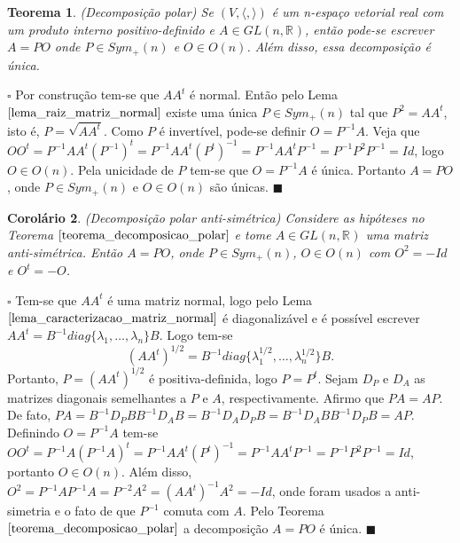 \documentclass[12pt]{book}
\newtheorem{teorema}{Teorema}[section]
\newtheorem{corolario}[teorema]{Corolário}
\newenvironment{prova}[1]{$\square$ #1}{\hfill$\blacksquare$}
\newcommand{\generalgroup}[2]{GL(#1, #2)}
\newcommand{\generalgroupreal}[1]{\generalgroup{#1}{\real{}}}
\newcommand{\matrizortogonal}[1]{O(#1)}
\newcommand{\matrizsimetricapositiva}[1]{Sym_{+}(#1)}
\newcommand{\produtointerno}[2]{\langle #1, #2 \rangle}
\newcommand{\real}[1]{\mathbb{R}^{#1}}
\begin{document}
	\begin{teorema}\label{teorema_decomposicao_polar}
		(Decomposição polar) Se $(V, \produtointerno{}{})$ é um n-espaço vetorial real com um produto interno positivo-definido e $A \in \generalgroupreal{n}$, então pode-se escrever $A=PO$ onde $P \in  \matrizsimetricapositiva{n}$ e $O \in \matrizortogonal{n}$. Além disso, essa decomposição é única.
	\end{teorema}
	\begin{prova}
		Por construção tem-se que $AA^{t}$ é normal. Então pelo Lema $\ref{lema_raiz_matriz_normal}$ existe uma única $P \in \matrizsimetricapositiva{n}$ tal que $P^{2} = AA^{t}$, isto é, $P = \sqrt{AA^{t}}$. Como $P$ é invertível, pode-se definir $O = P^{-1}A$. Veja que $OO^{t} = P^{-1}AA^{t}(P^{-1})^{t} = P^{-1}AA^{t}(P^{t})^{-1} = P^{-1}AA^{t}P^{-1} = P^{-1}P^{2}P^{-1} = Id$, logo $O \in \matrizortogonal{n}$. Pela unicidade de $P$ tem-se que $O=P^{-1}A$ é única. Portanto $A=PO$, onde $P \in \matrizsimetricapositiva{n}$ e $O \in \matrizortogonal{n}$ são únicas.
	\end{prova}
	
	\begin{corolario}\label{corolario_decomposicao_matriz_antisimetrica}
		(Decomposição polar anti-simétrica) Considere as hipóteses no Teorema $\ref{teorema_decomposicao_polar}$ e tome $A \in \generalgroupreal{n}$ uma matriz anti-simétrica. Então $A = PO$, onde $P \in \matrizsimetricapositiva{n}$, $O \in \matrizortogonal{n}$ com  $O^{2} = -Id$ e $O^{t} = -O$.
	\end{corolario}
	\begin{prova}
		Tem-se que $AA^{t}$ é uma matriz normal, logo pelo Lema $\ref{lema_caracterizacao_matriz_normal}$ é diagonalizável e é possível escrever $AA^{t} = B^{-1}diag\{\lambda_{1}, \dots, \lambda_{n}\}B$. Logo tem-se 
		$$
		(AA^{t})^{1/2} =B^{-1}diag\{\lambda_{1}^{1/2}, \dots, \lambda_{n}^{1/2}\}B.
		$$
		Portanto, $P=(AA^{t})^{1/2}$ é positiva-definida, logo $P=P^{t}$. Sejam $D_{P}$ e $D_{A}$ as matrizes diagonais semelhantes a $P$ e $A$, respectivamente. Afirmo que $PA = AP$. De fato, $PA = B^{-1}D_{P}B B^{-1}D_{A}B = B^{-1}D_{A} D_{P}B = B^{-1}D_{A}B B^{-1}D_{P}B = AP$. Definindo $O = P^{-1}A$ tem-se $OO^{t} = P^{-1}A(P^{-1}A)^{t} = P^{-1}AA^{t}(P^{t})^{-1} = P^{-1}AA^{t}P^{-1} = P^{-1}P^{2}P^{-1}  = Id$, portanto $O \in \matrizortogonal{n}$. Além disso, $O^{2} = P^{-1}AP^{-1}A = P^{-2}A^{2} = (AA^{t})^{-1}A^{2} = -Id$, onde foram usados a anti-simetria e o fato de que $P^{-1}$ comuta com $A$. Pelo Teorema $\ref{teorema_decomposicao_polar}$ a decomposição $A=PO$ é única.
	\end{prova}
	
\end{document}
